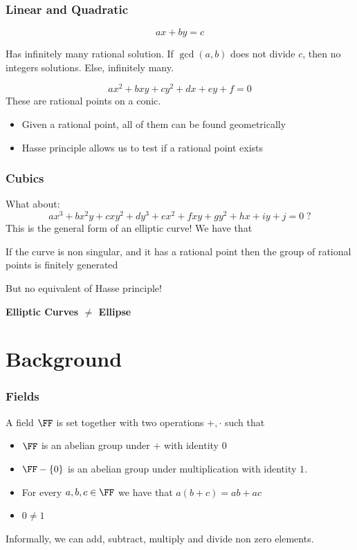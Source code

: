 \documentclass{beamer}
\begin{document}
\begin{frame}
    \frametitle{Linear and Quadratic}
    \[ a x + b y = c \]
    \begin{theorem}
        Has infinitely many rational solution. If $\gcd(a, b)$ does not divide $c$, then no integers solutions.
        Else, infinitely many.
    \end{theorem}
    \[ a x^2 + b x y + c y^2  + d x + e y + f = 0 \]
    These are rational points on a conic. 
    \begin{itemize}
        \item Given a rational point, all of them can be found geometrically
        \item Hasse principle allows us to test if a rational point exists
    \end{itemize}

\end{frame}

\begin{frame}
    \frametitle{Cubics}
    What about:
    \[ a x^3 + b x^2 y + c x y^2 + d y^3 + e x^2 + f x y + g y^2 + h x + i y + j = 0 \; ? \]
    This is the general form of an elliptic curve!
    We have that 
    \begin{theorem}[Mordell]
        If the curve is non singular, and it has a rational point then the group of rational points is finitely generated
    \end{theorem}
    But no equivalent of Hasse principle!

    \begin{center}
        \textbf{Elliptic Curves $\neq$ Ellipse}
    \end{center}
\end{frame}

\section{Background}
\begin{frame}
    \frametitle{Fields}
    \begin{definition}
        A field $\FF$ is set together with two operations $+, \cdot$ such that 
        \begin{itemize}
            \item $\FF$ is an abelian group under $+$ with identity $0$
            \item $\FF - \{ 0 \}$ is an abelian group under multiplication with identity $1$.
            \item For every $a,b,c \in \FF$ we have that $a (b + c) = ab + ac$
            \item $0 \neq 1$
        \end{itemize}
    \end{definition}
    Informally, we can add, subtract, multiply and divide non zero elements.
\end{frame}
\end{document}
